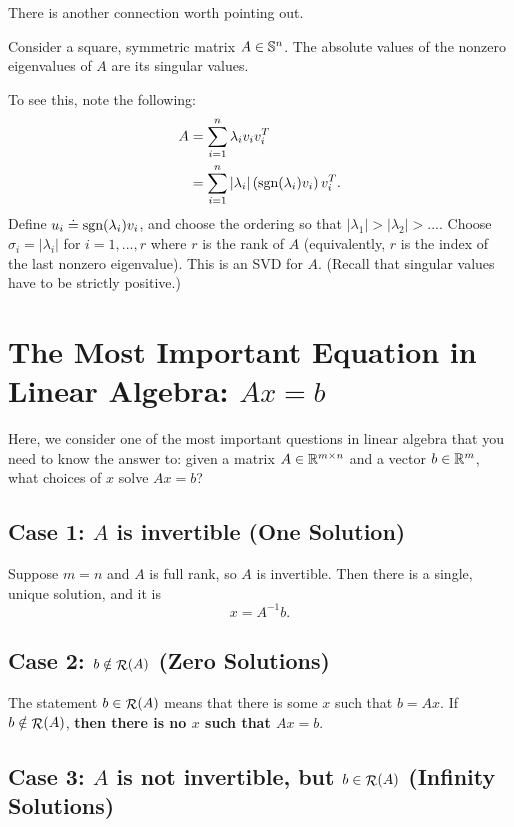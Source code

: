 \documentclass[12pt]{article}
\begin{document}
There is another connection worth pointing out.
\begin{fact}
Consider a square, symmetric matrix $A \in { {\mathbb S}^{n} }$. The absolute values of the nonzero eigenvalues of $A$ are its singular values.
\end{fact}

To see this, note the following:
%
\begin{align*}
A &= \sum_{i=1}^n \lambda_i v_i v_i^T \\
&= \sum_{i=1}^n |\lambda_i| \left( \mbox {\rm sgn}(\lambda_i) v_i \right) v_i^T.
\end{align*}
%
Define $u_i \doteq \mbox {\rm sgn}(\lambda_i) v_i$, and choose the ordering so that $|\lambda_1| > |\lambda_2| > ...$. Choose $\sigma_i = |\lambda_i|$ for $i=1, ..., r$ where $r$ is the rank of $A$ (equivalently, $r$ is the index of the last nonzero eigenvalue). This is an SVD for $A$. (Recall that singular values have to be strictly positive.)

\pagebreak


\section{The Most Important Equation in Linear Algebra: $Ax = b$}

Here, we consider one of the most important questions in linear algebra that you need to know the answer to: given a matrix $A \in { {\mathbb R}^{m \times n} }$ and a vector $b \in { {\mathbb R}^{m} }$, what choices of $x$ solve $Ax = b$?

\subsection{Case 1: $A$ is invertible (One Solution)}

Suppose $m=n$ and $A$ is full rank, so $A$ is invertible. Then there is a single, unique solution, and it is 
%
\begin{equation*}
x = A^{-1} b.
\end{equation*}


\subsection{Case 2: $b \notin \mathop{\mathcal{R}}\nolimits(A)$ (Zero Solutions)}

The statement $b \in \mathop{\mathcal{R}}\nolimits(A)$ means that there is some $x$ such that $b = Ax$. If $b \notin \mathop{\mathcal{R}}\nolimits(A)$, \textbf{then there is no $x$ such that $Ax=b$}. 

\subsection{Case 3: $A$ is not invertible, but $b \in \mathop{\mathcal{R}}\nolimits(A)$ (Infinity Solutions)}
\end{document}
